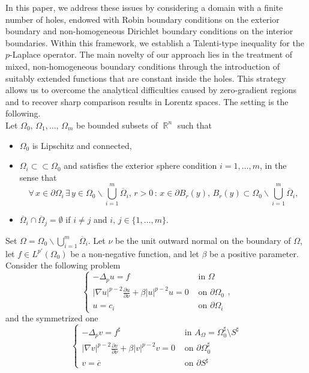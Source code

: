 \documentclass[12pt]{article}
\newcommand{\abs}[1]{{\left|#1\right|}}
\theoremstyle{definition}
\theoremstyle{plain}
\theoremstyle{definition}
\DeclareMathOperator{\R}{\mathbb{R}}
\begin{document}
In this paper, we address these issues by considering a domain with a finite number of holes, endowed with Robin boundary conditions on the exterior boundary and non-homogeneous Dirichlet boundary conditions on the interior boundaries. Within this framework, we establish a Talenti-type inequality for the $p$-Laplace operator.  
The main novelty of our approach lies in the treatment of mixed, non-homogeneous boundary conditions through the introduction of suitably extended functions that are constant inside the holes. This strategy allows us to overcome the analytical difficulties caused by zero-gradient regions and to recover sharp comparison results in Lorentz spaces. The setting is the following.\\
Let $\Omega_0,\,\Omega_1,\dots,\,\Omega_m$ be bounded subsets of $\R^n$ such that 
\begin{itemize}
    \item[(i)] $\Omega_0$ is Lipschitz and connected,
    \item[(ii)] $\Omega_i\subset\subset\Omega_0$ and satisfies the exterior sphere condition $i=1,\dots,m$, in the sense that
    \begin{equation*}
        \forall\,x\in\partial\Omega_i\,\exists\,y\in\Omega_0\backslash\bigcup_{i=1}^m\overline{\Omega}_i,\,r>0\,:\,x\in\partial B_r(y),\,B_r(y)\subset\Omega_0\backslash\bigcup_{i=1}^m\overline{\Omega}_i,
    \end{equation*}
    \item[(iii)] $\overline{\Omega}_i\cap\overline{\Omega}_j=\emptyset$ if $i\neq j$ and $i,\,j\in\{1,\dots,m\}$.
\end{itemize}
 Set $\Omega=\Omega_0\backslash\bigcup_{i=1}^m\overline{\Omega}_i$. Let $\nu$ be the unit outward normal on the boundary of $\Omega$, let $f\in L^{p'}(\Omega_0)$ be a non-negative function, and let $\beta$ be a positive parameter. Consider the following problem
\begin{equation}\label{prob}
    \begin{cases}
        -\Delta_p u=f &\text{ in } \Omega\\
        \abs{\nabla u}^{p-2}\frac{\partial u}{\partial\nu}+\beta \abs{u}^{p-2}u=0 &\text{ on }\partial\Omega_0 \\
        u=c_i&\text{ on }\partial\Omega_i
    \end{cases},
\end{equation}
and the symmetrized one
\begin{equation}\label{probsymm}
    \begin{cases}
        -\Delta_p v=f^\sharp &\text{ in } A_\Omega=\Omega_0^\sharp\setminus S^\sharp\\
        \abs{\nabla v}^{p-2}\frac{\partial v}{\partial\nu}+\beta \abs{v}^{p-2}v=0 &\text{ on }\partial\Omega_0^\sharp \\
        v=\overline c &\text{ on }\partial S^\sharp
    \end{cases}
\end{equation}
\end{document}
